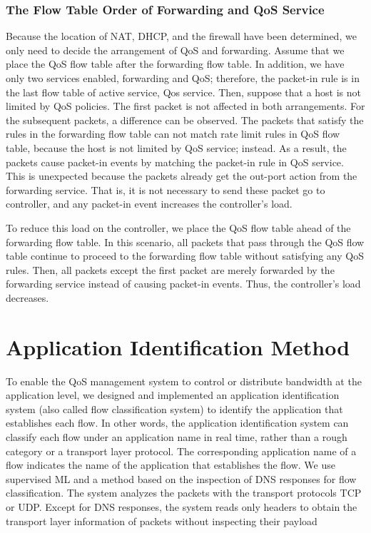 \documentclass[10pt,journal]{IEEEtran}
\begin{document}
\subsubsection{The Flow Table Order of Forwarding and QoS Service}
Because the location of NAT, DHCP, and the firewall have been determined, we only need to decide the arrangement of QoS and forwarding. Assume that we place the QoS flow table after the forwarding flow table. In addition, we have only two services enabled, forwarding and QoS; therefore, the packet-in rule is in the last flow table of active service, Qos service. Then, suppose that a host is not limited by QoS policies. The first packet is not affected in both arrangements. For the subsequent packets, a difference can be observed. The packets that satisfy the rules in the forwarding flow table can not match rate limit rules in QoS flow table, because the host is not limited by QoS service; instead. As a result, the packets cause packet-in events by matching the packet-in rule in QoS service. This is unexpected because the packets already get the out-port action from the forwarding service. That is, it is not necessary to send these packet go to controller, and any packet-in event increases the controller’s load.

To reduce this load on the controller, we place the QoS flow table ahead of the forwarding flow table. In this scenario, all packets that pass through the QoS flow table continue to proceed to the forwarding flow table without satisfying any QoS rules. Then, all packets except the first packet are merely forwarded by the forwarding service instead of causing packet-in events. Thus, the controller’s load decreases.



\section{Application Identification Method}\label{sec:app_identification}
To enable the QoS management system to control or distribute bandwidth at the application level, we designed and implemented an application identification system (also called flow classification system) to identify the application that establishes each flow. In other words, the application identification system can classify each flow under an application name in real time, rather than a rough category or a transport layer protocol. The corresponding application name of a flow indicates the name of the application that establishes the flow. We use supervised ML and a method based on the inspection of DNS responses for flow classification. The system analyzes the packets with the transport protocols TCP or UDP. Except for DNS responses, the system reads only headers to obtain the transport layer information of packets without inspecting their payload
\end{document}
